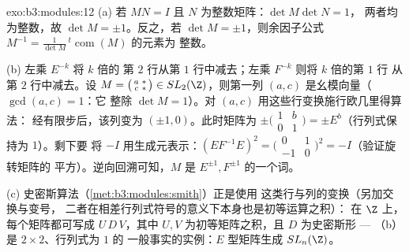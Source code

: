 \begin{solution}{exo:b3:modules:12}
(a) 若 $MN = I$ 且 $N$ 为整数矩阵：$\det M\det N = 1$，
两者均为整数，故 $\det M = \pm1$。反之，若 $\det M =
\pm1$，则余因子公式 $M^{-1} =
\frac1{\det M}\,{}^t\!\operatorname{com}(M)$ 的元素为
整数。

(b) 左乘 $E^{-k}$ 将 $k$ 倍的
第 $2$ 行从第 $1$ 行中减去；左乘 $F^{-k}$ 则将 $k$ 倍的第 $1$ 行
从第 $2$ 行中减去。设 $M = \bigl(\begin{smallmatrix}a & *\\ c &
*\end{smallmatrix}\bigr) \in SL_2(\Z)$，则第一列
$(a, c)$ 是幺模向量（$\gcd(a, c) = 1$：它
整除 $\det M = 1$）。对 $(a, c)$ 用这些行变换施行欧几里得算法：
经有限步后，该列变为
$(\pm1, 0)$。此时矩阵为 $\pm
\bigl(\begin{smallmatrix}1 & b\\ 0 & 1\end{smallmatrix}
\bigr) = \pm E^{b}$（行列式保持为 $1$）。剩下要
将 $-I$ 用生成元表示：$(EF^{-1}E)^2 =
\bigl(\begin{smallmatrix}0 & 1\\ -1 &
0\end{smallmatrix}\bigr)^2 = -I$（验证旋转矩阵的
平方）。逆向回溯可知，$M$ 是 $E^{\pm1},
F^{\pm1}$ 的一个词。

(c) 史密斯算法（\cref{met:b3:modules:smith}）正是使用
这类行与列的变换（另加交换与变号，
二者在相差行列式符号的意义下本身也是初等运算之积）：
在 $\Z$ 上，每个矩阵都可写成
$U\,D\,V$，其中 $U, V$ 为初等矩阵之积，且
$D$ 为史密斯形 --- （b）是 $2\times2$、行列式为 $1$ 的
一般事实的实例：$E$ 型矩阵生成
$SL_n(\Z)$。
\end{solution}

